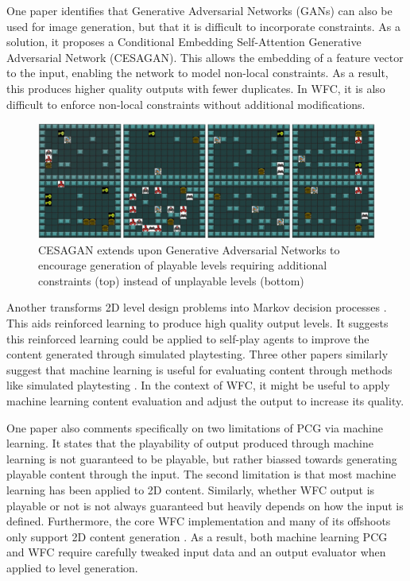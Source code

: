 One paper \cite{CESAGAN} identifies that Generative Adversarial Networks (GANs) can also be used for image generation, but that it is difficult to incorporate constraints. As a solution, it proposes a Conditional Embedding Self-Attention Generative Adversarial Network (CESAGAN). This allows the embedding of a feature vector to the input, enabling the network to model non-local constraints. As a result, this produces higher quality outputs with fewer duplicates. In WFC, it is also difficult to enforce non-local constraints without additional modifications.

\begin{figure}[H]
    \centering
    \includegraphics[width=\textwidth, height=0.3\textheight, keepaspectratio]{Images/CESAGAN.jpg}
    \caption{CESAGAN extends upon Generative Adversarial Networks to encourage generation of playable levels requiring additional constraints (top) instead of unplayable levels (bottom) \cite{CESAGAN}}
    \label{fig:cesagan}
\end{figure}

Another transforms 2D level design problems into Markov decision processes \cite{Markov_PCGRL}. This aids reinforced learning to produce high quality output levels. It suggests this reinforced learning could be applied to self-play agents to improve the content generated through simulated playtesting. Three other papers similarly suggest that machine learning is useful for evaluating content through methods like simulated playtesting \cite{DeepLearningPCG, VGDL_ASP, PCGML}. In the context of WFC, it might be useful to apply machine learning content evaluation and adjust the output to increase its quality.

One paper \cite{PCGML} also comments specifically on two limitations of PCG via machine learning. It states that the playability of output produced through machine learning is not guaranteed to be playable, but rather biassed towards generating playable content through the input. The second limitation is that most machine learning has been applied to 2D content. Similarly, whether WFC output is playable or not is not always guaranteed but heavily depends on how the input is defined. Furthermore, the core WFC implementation and many of its offshoots only support 2D content generation \cite{Gumin_Wave_Function_Collapse_2016}. As a result, both machine learning PCG and WFC require carefully tweaked input data and an output evaluator when applied to level generation.

